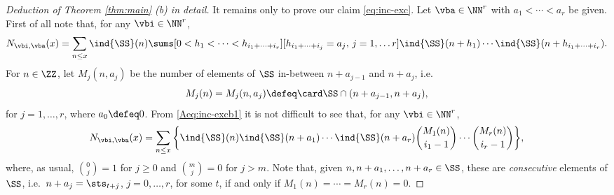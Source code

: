 \documentclass[12pt, reqno, twoside, letterpaper]{amsart}
\begin{document}
\begin{nixnix}
\begin{proof}[Deduction of Theorem \ref{thm:main} (b) in detail]
It remains only to prove our claim \eqref{eq:inc-exc}.
%
Let $\vba \in \NN^r$ with $a_1 < \cdots < a_r$ be given.
%
First of all note that, for any $\vbi \in \NN^r$, 
\begin{equation}
 \label{Aeq:inc-excb1}
 N_{\vbi,\vba}(x)
  =
   \sum_{n \le x} \ind{\SS}(n)
    \sums[0 < h_1 < \cdots < h_{i_1 + \cdots + i_r}]
         [h_{i_1 + \cdots + i_j} = a_j, \, j = 1,\ldots r]
          \ind{\SS}(n + h_1)\cdots \ind{\SS}(n + h_{i_1 + \cdots + i_r}).
\end{equation}
%
For $n \in \ZZ$, let $M_j(n,a_j)$ be the number of elements of 
$\SS$ in-between $n + a_{j - 1}$ and $n + a_j$, i.e.\ 
\[
 M_j(n)
  =
   M_j(n,a_j)
    \defeq 
      \card \SS \cap (n + a_{j - 1},n + a_j),    
\] 
for $j = 1,\ldots,r$, where $a_0 \defeq 0$.
%
From \eqref{Aeq:inc-excb1} it is not difficult to see that, for 
any $\vbi \in \NN^r$, 
\begin{equation}
 \label{Aeq:inc-excb2}
 N_{\vbi,\vba}(x)
  =
   \sum_{n \le x}
    \bigg\{
     \ind{\SS}(n)
      \ind{\SS}(n + a_1)\cdots \ind{\SS}(n + a_r)
       \binom{M_1(n)}{i_1 - 1}
        \cdots 
         \binom{M_r(n)}{i_r - 1} 
    \bigg\},
\end{equation}
where, as usual, $\binom{0}{j} = 1$ for $j \ge 0$ and 
$\binom{m}{j} = 0$ for $j > m$.
%
Note that, given $n,n + a_1,\ldots,n + a_r \in \SS$, these are 
{\em consecutive} elements of $\SS$, i.e.\ 
$n + a_j = \sts_{t + j}$, $j = 0,\ldots,r$, for some $t$, if and 
only if $M_1(n) = \cdots = M_r(n) = 0$.


\end{proof}
\end{nixnix}
\end{document}
